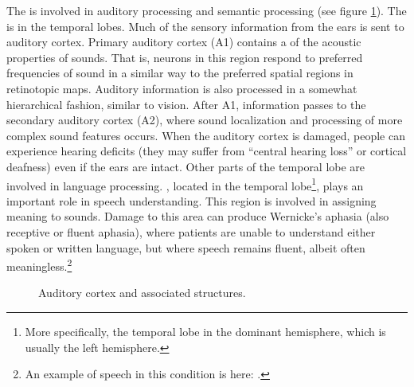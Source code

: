 The  is involved in auditory processing and semantic processing (see figure \ref{brain_audition}). The  is in the temporal lobes. Much of the sensory information from the ears is sent to auditory cortex. Primary auditory cortex (A1) contains a  of the acoustic properties of sounds. That is, neurons in this region respond to preferred frequencies of sound in a similar way to the preferred spatial regions in retinotopic maps. Auditory information is also processed in a somewhat hierarchical fashion, similar to vision. After A1, information passes to the secondary auditory cortex (A2), where sound localization and processing of more complex sound features occurs. When the auditory cortex is damaged, people can experience hearing deficits (they may suffer from ``central hearing loss'' or cortical deafness) even if the ears are intact. Other parts of the temporal lobe are involved in language processing. , located in the temporal lobe\footnote{More specifically, the temporal lobe in the dominant hemisphere, which is usually the left hemisphere.}, plays an important role in speech understanding. This region is involved in assigning meaning to sounds. Damage to this area can produce Wernicke's aphasia (also receptive or fluent aphasia), where patients are unable to understand either spoken or written language, but where speech remains fluent, albeit often meaningless.\footnote{An example of speech in this condition is here: .}

\begin{figure}[h]
\centering
{}
\caption[Pamela Payne.]{Auditory cortex and associated structures.}
\label{brain_audition}
\end{figure}


